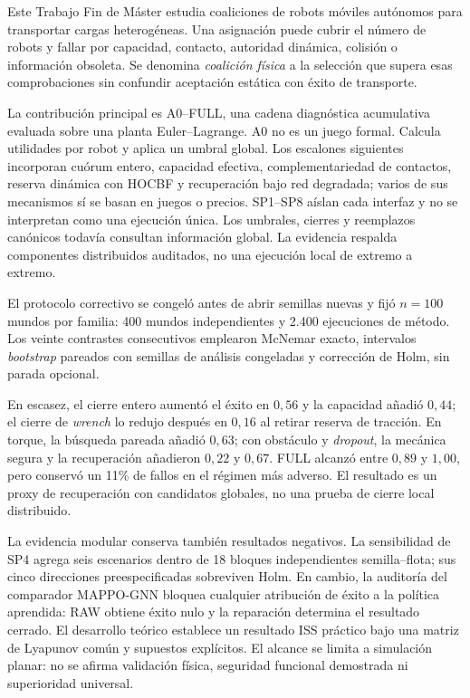 \begin{viuabstract}
Este Trabajo Fin de Máster estudia coaliciones de robots móviles autónomos para transportar cargas heterogéneas. Una asignación puede cubrir el número de robots y fallar por capacidad, contacto, autoridad dinámica, colisión o información obsoleta. Se denomina \emph{coalición física} a la selección que supera esas comprobaciones sin confundir aceptación estática con éxito de transporte.

La contribución principal es A0--FULL, una cadena diagnóstica acumulativa evaluada sobre una planta Euler--Lagrange. A0 no es un juego formal. Calcula utilidades por robot y aplica un umbral global. Los escalones siguientes incorporan cuórum entero, capacidad efectiva, complementariedad de contactos, reserva dinámica con HOCBF y recuperación bajo red degradada; varios de sus mecanismos sí se basan en juegos o precios. SP1--SP8 aíslan cada interfaz y no se interpretan como una ejecución única. Los umbrales, cierres y reemplazos canónicos todavía consultan información global. La evidencia respalda componentes distribuidos auditados, no una ejecución local de extremo a extremo.

El protocolo correctivo se congeló antes de abrir semillas nuevas y fijó $n=100$ mundos por familia: 400 mundos independientes y 2.400 ejecuciones de método. Los veinte contrastes consecutivos emplearon McNemar exacto, intervalos \emph{bootstrap} pareados con semillas de análisis congeladas y corrección de Holm, sin parada opcional.

En escasez, el cierre entero aumentó el éxito en $0{,}56$ y la capacidad añadió $0{,}44$; el cierre de \emph{wrench} lo redujo después en $0{,}16$ al retirar reserva de tracción. En torque, la búsqueda pareada añadió $0{,}63$; con obstáculo y \emph{dropout}, la mecánica segura y la recuperación añadieron $0{,}22$ y $0{,}67$. FULL alcanzó entre $0{,}89$ y $1{,}00$, pero conservó un 11\% de fallos en el régimen más adverso. El resultado es un proxy de recuperación con candidatos globales, no una prueba de cierre local distribuido.

La evidencia modular conserva también resultados negativos. La sensibilidad de SP4 agrega seis escenarios dentro de 18 bloques independientes semilla--flota; sus cinco direcciones preespecificadas sobreviven Holm. En cambio, la auditoría del comparador MAPPO-GNN bloquea cualquier atribución de éxito a la política aprendida: RAW obtiene éxito nulo y la reparación determina el resultado cerrado. El desarrollo teórico establece un resultado ISS práctico bajo una matriz de Lyapunov común y supuestos explícitos. El alcance se limita a simulación planar: no se afirma validación física, seguridad funcional demostrada ni superioridad universal.

\end{viuabstract}

\clearpage
